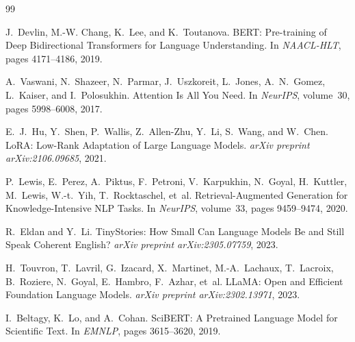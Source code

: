 \documentclass[11pt,a4paper]{article}
\theoremstyle{plain}
\theoremstyle{definition}
\begin{document}

\begin{thebibliography}{99}

J.~Devlin, M.-W. Chang, K.~Lee, and K.~Toutanova.
\newblock BERT: Pre-training of Deep Bidirectional Transformers for Language Understanding.
\newblock In \emph{NAACL-HLT}, pages 4171--4186, 2019.

A.~Vaswani, N.~Shazeer, N.~Parmar, J.~Uszkoreit, L.~Jones, A.~N.~Gomez, 
L.~Kaiser, and I.~Polosukhin.
\newblock Attention Is All You Need.
\newblock In \emph{NeurIPS}, volume~30, pages 5998--6008, 2017.

E.~J.~Hu, Y.~Shen, P.~Wallis, Z.~Allen-Zhu, Y.~Li, S.~Wang, and W.~Chen.
\newblock LoRA: Low-Rank Adaptation of Large Language Models.
\newblock \emph{arXiv preprint arXiv:2106.09685}, 2021.

P.~Lewis, E.~Perez, A.~Piktus, F.~Petroni, V.~Karpukhin, N.~Goyal, 
H.~Kuttler, M.~Lewis, W.-t.~Yih, T.~Rocktaschel, et~al.
\newblock Retrieval-Augmented Generation for Knowledge-Intensive NLP Tasks.
\newblock In \emph{NeurIPS}, volume~33, pages 9459--9474, 2020.

R.~Eldan and Y.~Li.
\newblock TinyStories: How Small Can Language Models Be and Still Speak Coherent English?
\newblock \emph{arXiv preprint arXiv:2305.07759}, 2023.

H.~Touvron, T.~Lavril, G.~Izacard, X.~Martinet, M.-A.~Lachaux, 
T.~Lacroix, B.~Roziere, N.~Goyal, E.~Hambro, F.~Azhar, et~al.
\newblock LLaMA: Open and Efficient Foundation Language Models.
\newblock \emph{arXiv preprint arXiv:2302.13971}, 2023.

I.~Beltagy, K.~Lo, and A.~Cohan.
\newblock SciBERT: A Pretrained Language Model for Scientific Text.
\newblock In \emph{EMNLP}, pages 3615--3620, 2019.


\end{thebibliography}
\end{document}
